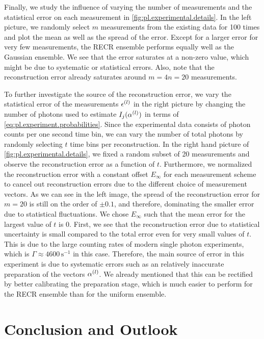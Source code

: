 Finally, we study the influence of varying the number of measurements and the statistical error on each measurement in \cref{fig:pl.experimental.details}.
In the left picture, we randomly select $m$ measurements from the existing data for 100 times and plot the mean as well as the spread of the error.
Except for a larger error for very few measurements, the RECR ensemble performs equally well as the Gaussian ensemble.
We see that the error saturates at a non-zero value, which might be due to systematic or statistical errors.
Also, note that the reconstruction error already saturates around $m = 4n = 20$ measurements.

To further investigate the source of the reconstruction error, we vary the statistical error of the measurements $\epsilon^{(l)}$ in the right picture by changing the number of photons used to estimate $I_j(\alpha^{(l)})$ in terms of \cref{eq:pl.experiment.probabilities}.
Since the experimental data consists of photon counts per one second time bin, we can vary the number of total photons by randomly selecting $t$ time bins per reconstruction.
In the right hand picture of \cref{fig:pl.experimental.details}, we fixed a random subset of 20 measurements and observe the reconstruction error as a function of $t$.
Furthermore, we normalized the reconstruction error with a constant offset $E_\infty$ for each measurement scheme to cancel out reconstruction errors due to the different choice of measurement vectors.
As we can see in the left image, the spread of the reconstruction error for $m=20$ is still on the order of $\pm 0.1$, and therefore, dominating the smaller error due to statistical fluctuations.
We chose $E_\infty$ such that the mean error for the largest value of $t$ is 0.
First, we see that the reconstruction error due to statistical uncertainty is small compared to the total error even for very small values of $t$.
This is due to the large counting rates of modern single photon experiments, which is $\Gamma \approx 4600\,\mathrm{s}^{-1}$ in this case.
Therefore, the main source of error in this experiment is due to systematic errors such as an relatively inaccurate preparation of the vectors $\alpha^{(l)}$.
We already mentioned that this can be rectified by better calibrating the preparation stage, which is much easier to perform for the RECR ensemble than for the uniform ensemble.


\section{Conclusion and Outlook}%
\label{sec:pl.final}

